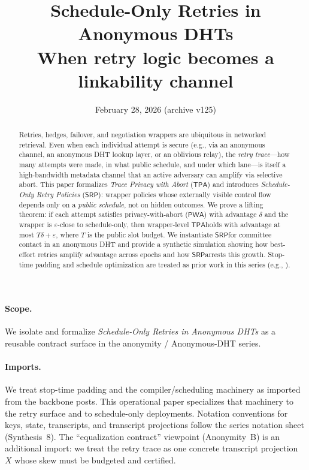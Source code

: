 \documentclass[11pt]{article}
\title{Schedule-Only Retries in Anonymous DHTs\\
\large When retry logic becomes a linkability channel}
\author{}
\date{February 28, 2026 (archive v125)}
\newcommand{\PWA}{\ensuremath{\mathsf{PWA}}}
\newcommand{\TPA}{\ensuremath{\mathsf{TPA}}}
\newcommand{\SRP}{\ensuremath{\mathsf{SRP}}}
\begin{document}
\maketitle

\begin{abstract}
Retries, hedges, failover, and negotiation wrappers are ubiquitous in networked retrieval.
Even when each individual attempt is secure (e.g., via an anonymous channel, an anonymous DHT lookup layer, or an oblivious relay),
the \emph{retry trace}---how many attempts were made, in what public schedule, and under which lane---is itself a high-bandwidth metadata channel that an active adversary can amplify via selective abort.
This paper formalizes \emph{Trace Privacy with Abort} (\TPA) and introduces \emph{Schedule-Only Retry Policies} (\SRP): wrapper policies whose externally visible control flow depends only on a \emph{public schedule}, not on hidden outcomes.
We prove a lifting theorem: if each attempt satisfies privacy-with-abort (\PWA) with advantage $\delta$ and the wrapper is $\varepsilon$-close to schedule-only, then wrapper-level \TPA holds with advantage at most $T\delta+\varepsilon$, where $T$ is the public slot budget.
We instantiate \SRP for committee contact in an anonymous DHT and provide a synthetic simulation showing how best-effort retries amplify advantage across epochs and how \SRP arrests this growth.
Stop-time padding and schedule optimization are treated as prior work in this series (e.g., \cite{series:schedcompiler,series:stoptimeaddendum}).
\end{abstract}

\paragraph{Scope.}
We isolate and formalize \emph{Schedule-Only Retries in Anonymous DHTs} as a reusable contract surface in the anonymity / Anonymous-DHT series.

\paragraph{Imports.}
We treat stop-time padding and the compiler/scheduling machinery as imported from the backbone posts.\cite{series:schedcompiler,series:stoptimeaddendum}
This operational paper specializes that machinery to the retry surface and to schedule-only deployments.
Notation conventions for keys, state, transcripts, and transcript projections follow the series notation sheet (Synthesis~8).\cite{series:notation}
The ``equalization contract'' viewpoint (Anonymity~B) is an additional import: we treat the retry trace as one concrete transcript projection $X$ whose skew must be budgeted and certified.\cite{series:profiling}
\end{document}
